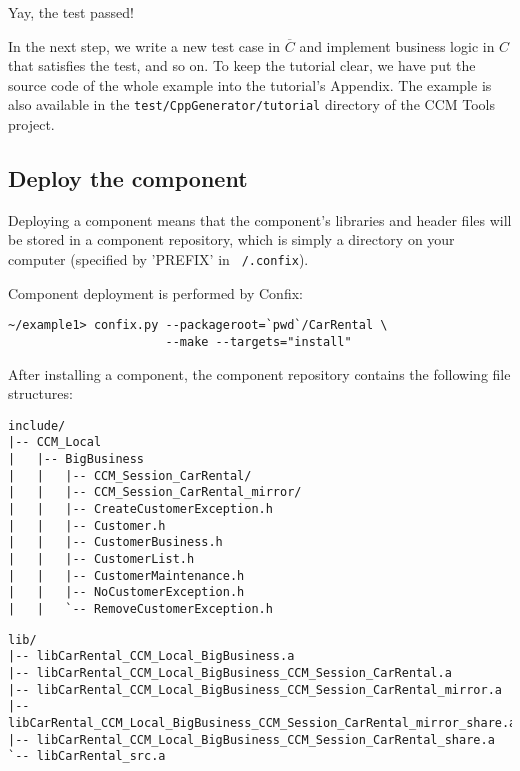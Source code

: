 Yay, the test passed!

In the next step, we write a new test case in $\overline{C}$ and implement 
business logic in $C$ that satisfies the test, and so on.
To keep the tutorial clear, we have put the source code of the whole example
into the tutorial's Appendix.
The example is also available in the {\tt test/CppGenerator/tutorial}
directory of the CCM Tools project. 

\newpage
\subsection{Deploy the component}

Deploying a component means that the component's libraries and header files will 
be stored in a component repository, which is simply a directory on your computer
(specified by 'PREFIX' in {\tt ~/.confix}).

Component deployment is performed by Confix:
\begin{small}
\begin{verbatim}
~/example1> confix.py --packageroot=`pwd`/CarRental \
                      --make --targets="install"
\end{verbatim}
\end{small}

After installing a component, the component repository contains the following
file structures:
\begin{small}
\begin{verbatim}
include/
|-- CCM_Local
|   |-- BigBusiness
|   |   |-- CCM_Session_CarRental/
|   |   |-- CCM_Session_CarRental_mirror/
|   |   |-- CreateCustomerException.h
|   |   |-- Customer.h
|   |   |-- CustomerBusiness.h
|   |   |-- CustomerList.h
|   |   |-- CustomerMaintenance.h
|   |   |-- NoCustomerException.h
|   |   `-- RemoveCustomerException.h
\end{verbatim}
\end{small}

\begin{small}
\begin{verbatim}
lib/
|-- libCarRental_CCM_Local_BigBusiness.a
|-- libCarRental_CCM_Local_BigBusiness_CCM_Session_CarRental.a
|-- libCarRental_CCM_Local_BigBusiness_CCM_Session_CarRental_mirror.a
|-- libCarRental_CCM_Local_BigBusiness_CCM_Session_CarRental_mirror_share.a
|-- libCarRental_CCM_Local_BigBusiness_CCM_Session_CarRental_share.a
`-- libCarRental_src.a
\end{verbatim}
\end{small}





